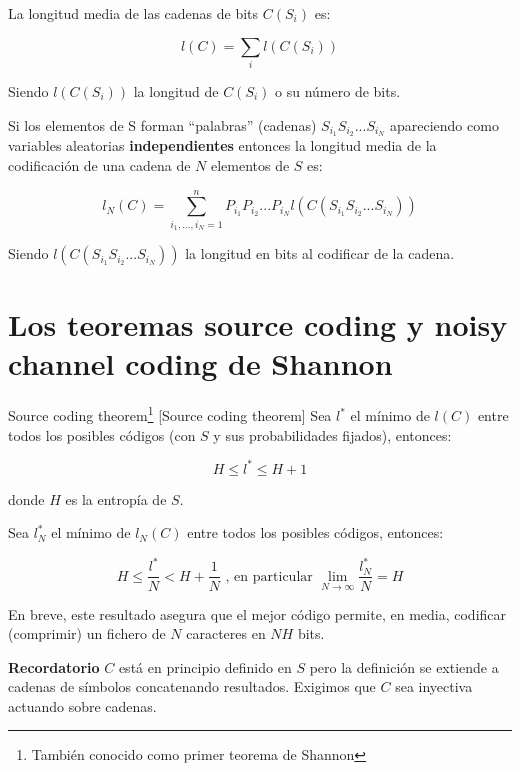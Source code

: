 	\begin{defn}
		La longitud media de las cadenas de bits $C(S_i)$ es:

		$$ l(C) = \sum_i l(C(S_i))$$

		Siendo $l(C(S_i))$ la longitud de $C(S_i)$ o su número de bits.
	\end{defn}

	Si los elementos de S forman ``palabras'' (cadenas) $S_{i_1} S_{i_2} ... S_{i_N}$ apareciendo como variables aleatorias \textbf{independientes} entonces la longitud media de la codificación de una cadena de $N$ elementos de $S$ es:

	$$l_{N}(C) = \sum_{i_1,...,i_N = 1}^{n} P_{i_1} P_{i_2} ... P_{i_N} l(C(S_{i_1} S_{i_2} ... S_{i_N}))$$

	Siendo $l(C(S_{i_1} S_{i_2} ... S_{i_N}))$ la longitud en bits al codificar de la cadena.

\section{Los teoremas source coding y noisy channel coding de Shannon}

	\begin{theorem}{Source coding theorem\footnote{También conocido como primer teorema de Shannon} }[Source coding theorem]
		Sea $l^*$ el mínimo de $l(C)$ entre todos los posibles códigos (con $S$ y sus probabilidades fijados), entonces:

		$$ H \leq l^* \leq H + 1 $$

		donde $H$ es la entropía de $S$.

	\end{theorem}


	\begin{corol}
		\label{corolario minima longitud}
		Sea $l^{*}_N$ el mínimo de $l_N(C)$ entre todos los posibles códigos, entonces:

		$$ H \leq \frac{l^*}{N} < H + \frac{1}{N} \text{ , en particular  } \lim_{N \rightarrow \infty} \frac{l^*_N}{N} = H$$

		En breve, este resultado asegura que el mejor código permite, en media, codificar (comprimir) un fichero de $N$ caracteres en $NH$ bits.

	\end{corol}


	\textbf{Recordatorio} $C$ está en principio definido en $S$ pero la definición se extiende a cadenas de símbolos concatenando resultados. Exigimos que $C$ sea inyectiva actuando sobre cadenas.

